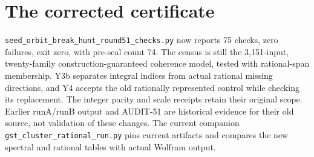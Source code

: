 \documentclass[11pt]{article}
\begin{document}
\section*{The corrected certificate}
\texttt{seed\_orbit\_break\_hunt\_round51\_checks.py} now reports
75 checks, zero failures, exit zero, with pre-seal count 74. The census is
still the 3,151-input, twenty-family construction-guaranteed coherence
model, tested with rational-span membership. Y3b separates integral
indices from actual rational missing directions, and Y4 accepts the old
rationally represented control while checking its replacement. The
integer parity and scale receipts retain their original scope. Earlier
runA/runB output and AUDIT-51 are historical evidence for their old
source, not validation of these changes. The current companion
\texttt{gst\_cluster\_rational\_run.py} pins current artifacts and compares
the new spectral and rational tables with actual Wolfram output.
\end{document}

